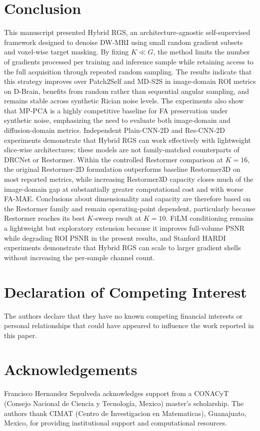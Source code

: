 \documentclass[preprint,12pt]{elsarticle}
\begin{document}
\section{Conclusion}
This manuscript presented Hybrid RGS, an architecture-agnostic self-supervised framework designed to denoise DW-MRI using small random gradient subsets and voxel-wise target masking. By fixing $K\ll G$, the method limits the number of gradients processed per training and inference sample while retaining access to the full acquisition through repeated random sampling. The results indicate that this strategy improves over Patch2Self and MD-S2S in image-domain ROI metrics on D-Brain, benefits from random rather than sequential angular sampling, and remains stable across synthetic Rician noise levels. The experiments also show that MP-PCA is a highly competitive baseline for FA preservation under synthetic noise, emphasizing the need to evaluate both image-domain and diffusion-domain metrics. Independent Plain-CNN-2D and Res-CNN-2D experiments demonstrate that Hybrid RGS can work effectively with lightweight slice-wise architectures; these models are not family-matched counterparts of DRCNet or Restormer. Within the controlled Restormer comparison at $K=16$, the original Restormer-2D formulation outperforms baseline Restormer3D on most reported metrics, while increasing Restormer3D capacity closes much of the image-domain gap at substantially greater computational cost and with worse FA-MAE. Conclusions about dimensionality and capacity are therefore based on the Restormer family and remain operating-point dependent, particularly because Restormer reaches its best $K$-sweep result at $K=10$. FiLM conditioning remains a lightweight but exploratory extension because it improves full-volume PSNR while degrading ROI PSNR in the present results, and Stanford HARDI experiments demonstrate that Hybrid RGS can scale to larger gradient shells without increasing the per-sample channel count.

\section*{Declaration of Competing Interest}
The authors declare that they have no known competing financial interests or personal relationships that could have appeared to influence the work reported in this paper.

\section*{Acknowledgements}
Francisco Hernandez Sepulveda acknowledges support from a CONACyT (Consejo Nacional de Ciencia y Tecnología, Mexico) master's scholarship. The authors thank CIMAT (Centro de Investigacion en Matematicas), Guanajuato, Mexico, for providing institutional support and computational resources.
\end{document}
